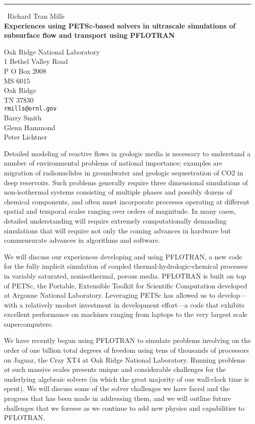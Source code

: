 \documentclass{report}
\begin{document}
\begin{center}
\rule{6in}{1pt} \
{\large Richard Tran Mills \\
{\bf Experiences using PETSc-based solvers in ultrascale simulations of subsurface flow and transport using PFLOTRAN}}

Oak Ridge National Laboratory \\ 1 Bethel Valley Road \\ P O Box 2008 \\ MS 6015 \\ Oak Ridge \\ TN 37830
\\
{\tt rmills@ornl.gov}\\
Barry Smith\\
Glenn Hammond\\
	Peter Lichtner\end{center}

Detailed modeling of reactive flows in geologic media is necessary to
understand a number of environmental problems of national importance;
examples are migration of radionuclides in groundwater and geologic
sequestration of CO2 in deep reservoirs. Such problems generally require
three dimensional simulations of non-isothermal systems consisting of
multiple phases and possibly dozens of chemical components, and often
must incorporate processes operating at different spatial and temporal
scales ranging over orders of magnitude. In many cases, detailed
understanding
will require extremely computationally demanding simulations that will
require not only the coming advances in hardware but commensurate
advances in algorithms and software.

We will discuss our experiences developing and using PFLOTRAN, a new code
for the fully implicit simulation of coupled thermal-hydrologic-chemical
processes in variably saturated, nonisothermal, porous media. PFLOTRAN is
built on top of PETSc, the Portable, Extensible Toolkit for Scientific
Computation developed at Argonne National Laboratory. Leveraging PETSc
has allowed us to develop---with a relatively modest investment in
development effort---a code that exhibits excellent performance on
machines ranging from laptops to the very largest scale supercomputers.

We have recently begun using PFLOTRAN to simulate problems involving on
the order of one billion total degrees of freedom using tens of thousands
of processors on Jaguar, the Cray XT4 at Oak Ridge National Laboratory.
Running problems at such massive scales presents unique and considerable
challenges for the underlying algebraic solvers (in which the great
majority of our wall-clock time is spent). We will discuss some of the
solver challenges we have faced and the progress that has been made in
addressing them, and we will outline future challenges
that we foresee as we continue to add new physics and capabilities to PFLOTRAN.
\end{document}
